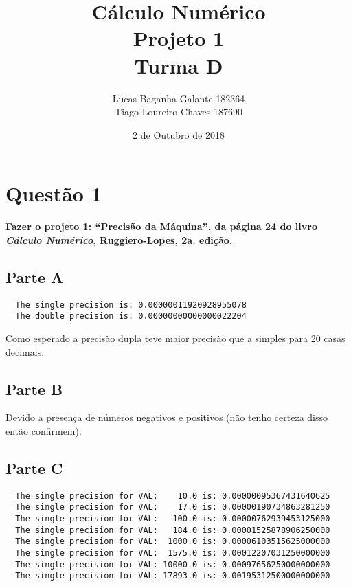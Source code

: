\documentclass[12pt,a4paper,final]{article}
\author{Lucas Baganha Galante 182364\\Tiago Loureiro Chaves 187690}
\title{Cálculo Numérico \\ Projeto 1 \\  \normalsize{Turma D}}
\date{ 2 de Outubro de 2018}
\begin{document}
\onehalfspace %

\maketitle


\section{Questão 1}
\textbf{Fazer o projeto 1: ``Precisão da Máquina'',
da página 24 do livro \textit{Cálculo Numérico}, Ruggiero-Lopes, 2a. edição.}

\subsection{Parte A}

\begin{lstlisting}
  The single precision is: 0.00000011920928955078
  The double precision is: 0.00000000000000022204
\end{lstlisting}

Como esperado a precisão dupla teve maior precisão que a simples para 20 casas decimais.

\subsection{Parte B}

Devido a presença de números negativos e positivos (não tenho certeza disso então confirmem).

\subsection{Parte C}

\begin{lstlisting}
  The single precision for VAL:    10.0 is: 0.00000095367431640625
  The single precision for VAL:    17.0 is: 0.00000190734863281250
  The single precision for VAL:   100.0 is: 0.00000762939453125000
  The single precision for VAL:   184.0 is: 0.00001525878906250000
  The single precision for VAL:  1000.0 is: 0.00006103515625000000
  The single precision for VAL:  1575.0 is: 0.00012207031250000000
  The single precision for VAL: 10000.0 is: 0.00097656250000000000
  The single precision for VAL: 17893.0 is: 0.00195312500000000000
\end{lstlisting}
\end{document}
